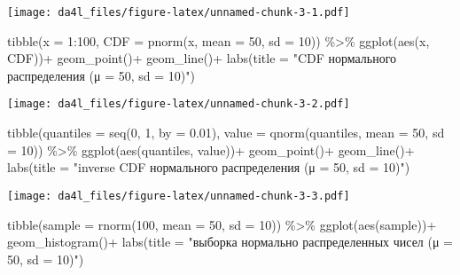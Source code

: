 \documentclass[
]{book}
\newenvironment{Shaded}{\begin{snugshade}}{\end{snugshade}}
\newcommand{\AttributeTok}[1]{\textcolor[rgb]{0.77,0.63,0.00}{#1}}
\newcommand{\DecValTok}[1]{\textcolor[rgb]{0.00,0.00,0.81}{#1}}
\newcommand{\FloatTok}[1]{\textcolor[rgb]{0.00,0.00,0.81}{#1}}
\newcommand{\FunctionTok}[1]{\textcolor[rgb]{0.00,0.00,0.00}{#1}}
\newcommand{\NormalTok}[1]{#1}
\newcommand{\SpecialCharTok}[1]{\textcolor[rgb]{0.00,0.00,0.00}{#1}}
\newcommand{\StringTok}[1]{\textcolor[rgb]{0.31,0.60,0.02}{#1}}
\begin{document}
\texttt{[image: da4l\_files/figure-latex/unnamed-chunk-3-1.pdf]}

\begin{Shaded}
\begin{Highlighting}[]
\FunctionTok{tibble}\NormalTok{(}\AttributeTok{x =} \DecValTok{1}\SpecialCharTok{:}\DecValTok{100}\NormalTok{,}
       \AttributeTok{CDF =} \FunctionTok{pnorm}\NormalTok{(x, }\AttributeTok{mean =} \DecValTok{50}\NormalTok{, }\AttributeTok{sd =} \DecValTok{10}\NormalTok{)) }\SpecialCharTok{\%\textgreater{}\%} 
  \FunctionTok{ggplot}\NormalTok{(}\FunctionTok{aes}\NormalTok{(x, CDF))}\SpecialCharTok{+}
  \FunctionTok{geom\_point}\NormalTok{()}\SpecialCharTok{+}
  \FunctionTok{geom\_line}\NormalTok{()}\SpecialCharTok{+}
  \FunctionTok{labs}\NormalTok{(}\AttributeTok{title =} \StringTok{"CDF нормального распределения (μ = 50, sd = 10)"}\NormalTok{)}
\end{Highlighting}
\end{Shaded}

\texttt{[image: da4l\_files/figure-latex/unnamed-chunk-3-2.pdf]}

\begin{Shaded}
\begin{Highlighting}[]
\FunctionTok{tibble}\NormalTok{(}\AttributeTok{quantiles =} \FunctionTok{seq}\NormalTok{(}\DecValTok{0}\NormalTok{, }\DecValTok{1}\NormalTok{, }\AttributeTok{by =} \FloatTok{0.01}\NormalTok{),}
       \AttributeTok{value =} \FunctionTok{qnorm}\NormalTok{(quantiles, }\AttributeTok{mean =} \DecValTok{50}\NormalTok{, }\AttributeTok{sd =} \DecValTok{10}\NormalTok{)) }\SpecialCharTok{\%\textgreater{}\%} 
  \FunctionTok{ggplot}\NormalTok{(}\FunctionTok{aes}\NormalTok{(quantiles, value))}\SpecialCharTok{+}
  \FunctionTok{geom\_point}\NormalTok{()}\SpecialCharTok{+}
  \FunctionTok{geom\_line}\NormalTok{()}\SpecialCharTok{+}
  \FunctionTok{labs}\NormalTok{(}\AttributeTok{title =} \StringTok{"inverse CDF нормального распределения (μ = 50, sd = 10)"}\NormalTok{)}
\end{Highlighting}
\end{Shaded}

\texttt{[image: da4l\_files/figure-latex/unnamed-chunk-3-3.pdf]}

\begin{Shaded}
\begin{Highlighting}[]
\FunctionTok{tibble}\NormalTok{(}\AttributeTok{sample =} \FunctionTok{rnorm}\NormalTok{(}\DecValTok{100}\NormalTok{, }\AttributeTok{mean =} \DecValTok{50}\NormalTok{, }\AttributeTok{sd =} \DecValTok{10}\NormalTok{)) }\SpecialCharTok{\%\textgreater{}\%} 
  \FunctionTok{ggplot}\NormalTok{(}\FunctionTok{aes}\NormalTok{(sample))}\SpecialCharTok{+}
  \FunctionTok{geom\_histogram}\NormalTok{()}\SpecialCharTok{+}
  \FunctionTok{labs}\NormalTok{(}\AttributeTok{title =} \StringTok{"выборка нормально распределенных чисел (μ = 50, sd = 10)"}\NormalTok{)}
\end{Highlighting}
\end{Shaded}
\end{document}
